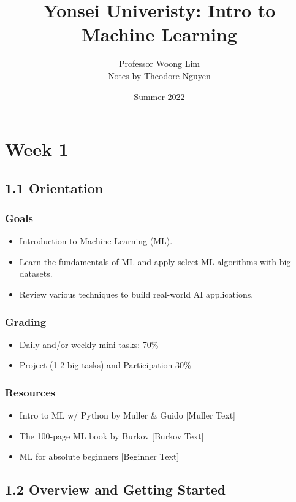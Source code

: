 \documentclass{article}
\title{Yonsei Univeristy: Intro to Machine Learning}
\author{Professor Woong Lim \\ Notes by Theodore Nguyen}
\date{Summer 2022}
\begin{document}
\begin{titlepage}
    \maketitle
    \tableofcontents
\end{titlepage}

\section*{Week 1}

\subsection*{1.1 Orientation}
\subsubsection*{Goals}
\begin{itemize}
    \item Introduction to Machine Learning (ML).
    \item Learn the fundamentals of ML and apply select
    ML algorithms with big datasets.
    \item Review various techniques to build real-world AI applications.
\end{itemize}
\subsubsection*{Grading}
\begin{itemize}
    \item Daily and/or weekly mini-tasks: 70\%
    \item Project (1-2 big tasks) and Participation 30\%
\end{itemize}
\subsubsection*{Resources}
\begin{itemize}
    \item Intro to ML w/ Python by Muller \& Guido [Muller Text]
    \item The 100-page ML book by Burkov [Burkov Text]
    \item ML for absolute beginners [Beginner Text]
\end{itemize}

\subsection*{1.2 Overview and Getting Started}
\end{document}
